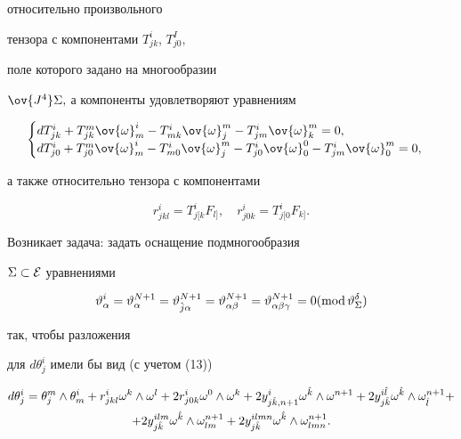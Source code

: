 относительно произвольного


тензора с компонентами $T^i_{jk}$, $T^I_{j0},$ 


поле которого задано на многообразии


$\ov{J^4}\Sigma,$ а компоненты удовлетворяют уравнениям


$$


\begin{cases}


dT^i_{jk}+T^m_{jk}\ov{\omega}^i_m-T^i_{mk}\ov{\omega}^m_j-


T^i_{jm}\ov{\omega}^m_k=0,\\


%


dT^i_{j0}+T^m_{j0}\ov{\omega}^i_m-T^i_{m0}\ov{\omega}^m_j-


T^i_{j0}\ov{\omega}^0_0-T^i_{jm}\ov{\omega}^m_0=0,


\end{cases}


$$


а также относительно тензора с компонентами


\begin{equation}


r^i_{jkl}=T^i_{j[k}F_{l]}, \quad r^i_{j0k}=T^i_{j[0}F_{k]}.


\end{equation}





Возникает задача: задать оснащение подмногообразия


$\Sigma\subset\cal E$ уравнениями


$$


\vartheta^i_\alpha=\vartheta^{N+1}_\alpha=


\vartheta^{N+1}_{\Hat{j}\alpha}=\vartheta^{N+1}_{\alpha\beta}=


\vartheta^{N+1}_{\alpha\beta\gamma}=0(\Mod\vartheta^\delta_\Sigma)


$$


так, чтобы разложения


для $d\theta^i_j$ имели бы вид (с учетом (13))


\begin{multline*}


d\theta^i_j=\theta^m_j\wedge\theta^i_m+


r^i_{jkl}\omega^k\wedge\omega^l+2r^i_{j0k}\omega^0\wedge\omega^k+


2y^i_{j\Hat{k},n+1}\omega^{\Hat{k}}\wedge\omega^{n+1}+


2y^{i\Hat{l}}_{j\Hat{k}}\omega^{\Hat{k}}\wedge\omega^{n+1}_{\Hat{l}}+ \\


%


+2y^{ilm}_{j\Hat{k}}\omega^{\Hat{k}}\wedge\omega^{n+1}_{lm}+


2y^{ilmn}_{j\Hat{k}}\omega^{\Hat{k}}\wedge\omega^{n+1}_{lmn}.


\end{multline*}



